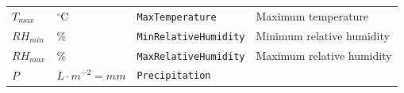 \documentclass[]{book}
\begin{document}
\begin{longtable}[]{@{}llll@{}}
\begin{minipage}[t]{0.11\columnwidth}
\(T_{max}\)\strut
\end{minipage} & \begin{minipage}[t]{0.10\columnwidth}\raggedright\strut
\(^{\circ} \mathrm{C}\)\strut
\end{minipage} & \begin{minipage}[t]{0.12\columnwidth}\raggedright\strut
\texttt{MaxTemperature}\strut
\end{minipage} & \begin{minipage}[t]{0.45\columnwidth}\raggedright\strut
Maximum temperature\strut
\end{minipage}\tabularnewline
\begin{minipage}[t]{0.11\columnwidth}\raggedright\strut
\(RH_{min}\)\strut
\end{minipage} & \begin{minipage}[t]{0.10\columnwidth}\raggedright\strut
\%\strut
\end{minipage} & \begin{minipage}[t]{0.12\columnwidth}\raggedright\strut
\texttt{MinRelativeHumidity}\strut
\end{minipage} & \begin{minipage}[t]{0.45\columnwidth}\raggedright\strut
Minimum relative humidity\strut
\end{minipage}\tabularnewline
\begin{minipage}[t]{0.11\columnwidth}\raggedright\strut
\(RH_{max}\)\strut
\end{minipage} & \begin{minipage}[t]{0.10\columnwidth}\raggedright\strut
\%\strut
\end{minipage} & \begin{minipage}[t]{0.12\columnwidth}\raggedright\strut
\texttt{MaxRelativeHumidity}\strut
\end{minipage} & \begin{minipage}[t]{0.45\columnwidth}\raggedright\strut
Maximum relative humidity\strut
\end{minipage}\tabularnewline
\begin{minipage}[t]{0.11\columnwidth}\raggedright\strut
\(P\)\strut
\end{minipage} & \begin{minipage}[t]{0.10\columnwidth}\raggedright\strut
\(L \cdot m^{-2} = mm\)\strut
\end{minipage} & \begin{minipage}[t]{0.12\columnwidth}\raggedright\strut
\texttt{Precipitation}\strut
\end{minipage} & \begin{minipage}[t]{0.45\columnwidth}\raggedright\strut

\end{minipage}
\end{longtable}
\end{document}
